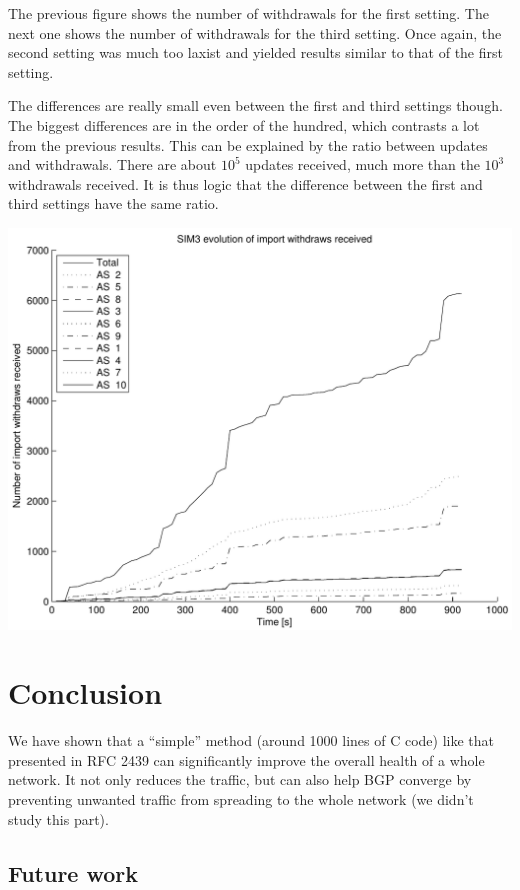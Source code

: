 \documentclass[a4paper,english]{IEEEtran}
\begin{document}
The previous figure shows the number of withdrawals for the first setting.
The next one shows the number of withdrawals for the third setting.
Once again, the second setting was much too laxist and yielded results similar to that of the first setting.

The differences are really small even between the first and third settings though.
The biggest differences are in the order of the hundred, which contrasts a lot from the previous results.
This can be explained by the ratio between updates and withdrawals.
There are about $10^5$ updates received, much more than the $10^3$ withdrawals received.
It is thus logic that the difference between the first and third settings have the same ratio.

\begin{center}
\includegraphics[scale=.5]{img/SIM3_withdrawals.pdf}
\end{center}

\section{Conclusion}

We have shown that a ``simple'' method (around 1000 lines of C code) like that presented in RFC 2439 can significantly improve the overall health of a whole network.
It not only reduces the traffic, but can also help BGP converge by preventing unwanted traffic from spreading to the whole network (we didn't study this part).

\subsection{Future work}
\end{document}
